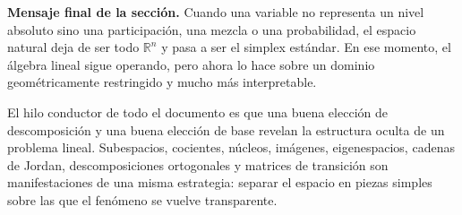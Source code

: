 \documentclass[10pt,a4paper,oneside]{article}
\theoremstyle{plain}
\theoremstyle{definition}
\theoremstyle{remark}
\newcommand{\R}{\mathbb{R}}
\begin{document}
\begin{summaryBox}
\textbf{Mensaje final de la sección.} Cuando una variable no representa un nivel absoluto sino una participación, una mezcla o una probabilidad, el espacio natural deja de ser todo $\R^n$ y pasa a ser el simplex estándar. En ese momento, el álgebra lineal sigue operando, pero ahora lo hace sobre un dominio geométricamente restringido y mucho más interpretable.
\end{summaryBox}

\begin{summaryBox}
El hilo conductor de todo el documento es que una buena elección de descomposición y una buena elección de base revelan la estructura oculta de un problema lineal. Subespacios, cocientes, núcleos, imágenes, eigenespacios, cadenas de Jordan, descomposiciones ortogonales y matrices de transición son manifestaciones de una misma estrategia: separar el espacio en piezas simples sobre las que el fenómeno se vuelve transparente.
\end{summaryBox}
\end{document}
